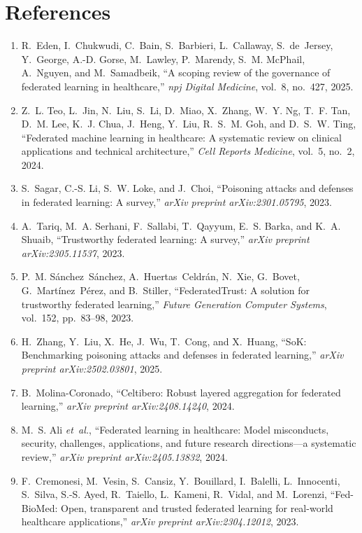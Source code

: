 \documentclass[10pt,twocolumn,letterpaper]{article}
\begin{document}
\section*{References}
\begin{enumerate}
\item R.~Eden, I.~Chukwudi, C.~Bain, S.~Barbieri, L.~Callaway, S.~de~Jersey, Y.~George, A.-D. Gorse, M.~Lawley, P.~Marendy, S.~M. McPhail, A.~Nguyen, and M.~Samadbeik, ``A scoping review of the governance of federated learning in healthcare,'' {\em npj Digital Medicine}, vol.~8, no.~427, 2025.
\item Z.~L. Teo, L.~Jin, N.~Liu, S.~Li, D.~Miao, X.~Zhang, W.~Y. Ng, T.~F. Tan, D.~M. Lee, K.~J. Chua, J.~Heng, Y.~Liu, R.~S.~M. Goh, and D.~S.~W. Ting, ``Federated machine learning in healthcare: A systematic review on clinical applications and technical architecture,'' {\em Cell Reports Medicine}, vol.~5, no.~2, 2024.
\item S.~Sagar, C.-S. Li, S.~W. Loke, and J.~Choi, ``Poisoning attacks and defenses in federated learning: A survey,'' {\em arXiv preprint arXiv:2301.05795}, 2023.
\item A.~Tariq, M.~A. Serhani, F.~Sallabi, T.~Qayyum, E.~S. Barka, and K.~A. Shuaib, ``Trustworthy federated learning: A survey,'' {\em arXiv preprint arXiv:2305.11537}, 2023.
\item P.~M. S{\'a}nchez~S{\'a}nchez, A.~Huertas~Celdr{\'a}n, N.~Xie, G.~Bovet, G.~Mart{\'i}nez~P{\'e}rez, and B.~Stiller, ``{FederatedTrust}: A solution for trustworthy federated learning,'' {\em Future Generation Computer Systems}, vol.~152, pp.~83--98, 2023.
\item H.~Zhang, Y.~Liu, X.~He, J.~Wu, T.~Cong, and X.~Huang, ``{SoK}: Benchmarking poisoning attacks and defenses in federated learning,'' {\em arXiv preprint arXiv:2502.03801}, 2025.
\item B.~Molina-Coronado, ``Celtibero: Robust layered aggregation for federated learning,'' {\em arXiv preprint arXiv:2408.14240}, 2024.
\item M.~S. Ali {\em et~al.}, ``Federated learning in healthcare: Model misconducts, security, challenges, applications, and future research directions---a systematic review,'' {\em arXiv preprint arXiv:2405.13832}, 2024.
\item F.~Cremonesi, M.~Vesin, S.~Cansiz, Y.~Bouillard, I.~Balelli, L.~Innocenti, S.~Silva, S.-S. Ayed, R.~Taiello, L.~Kameni, R.~Vidal, and M.~Lorenzi, ``{Fed-BioMed}: Open, transparent and trusted federated learning for real-world healthcare applications,'' {\em arXiv preprint arXiv:2304.12012}, 2023.

\end{enumerate}
\end{document}
